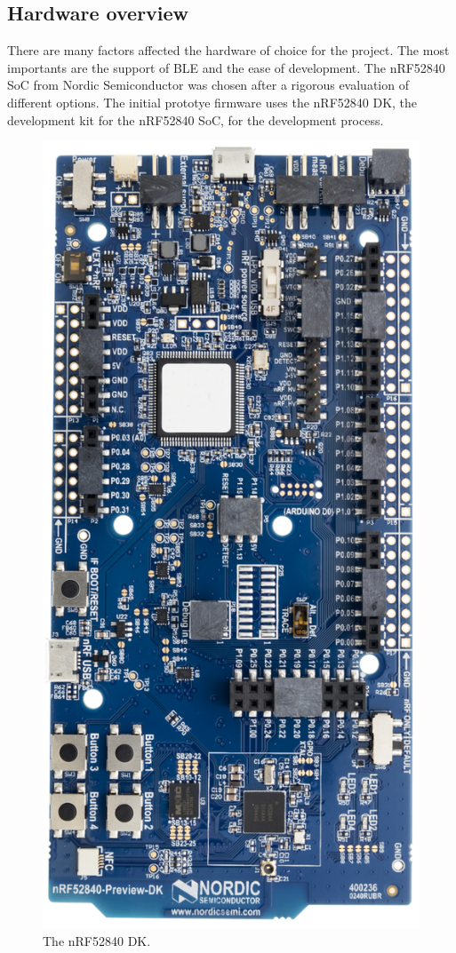 \subsection{Hardware overview}
\justify
There are many factors affected the hardware of choice for the project. The most 
importants are the support of BLE and the ease of development. The nRF52840 SoC 
from Nordic Semiconductor was chosen after a rigorous evaluation of different options.
The initial prototye firmware uses the nRF52840 DK, the development kit for the
nRF52840 SoC, for the development process.
\begin{figure}[H]
    \centering
    \includegraphics[scale=0.6]{figure/figure04_nRF52840.png}
    \caption{The nRF52840 DK.}
\end{figure}
